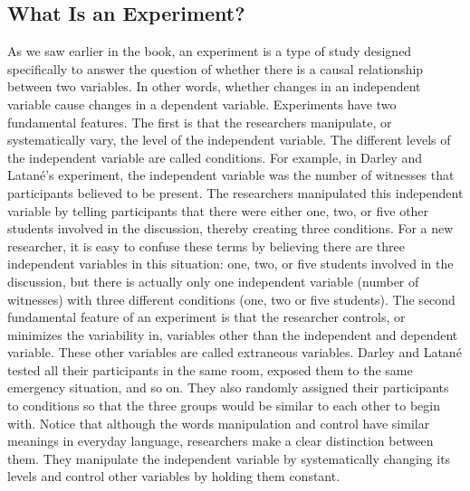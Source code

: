 
 \subsection{What Is an Experiment?}
 
 As we saw earlier in the book, an experiment is a type of study designed specifically to answer the question of whether there is a causal relationship between two variables. In other words, whether changes in an independent variable cause changes in a dependent variable. Experiments have two fundamental features. The first is that the researchers manipulate, or systematically vary, the level of the independent variable. The different levels of the independent variable are called conditions. For example, in Darley and Latané's experiment, the independent variable was the number of witnesses that participants believed to be present. The researchers manipulated this independent variable by telling participants that there were either one, two, or five other students involved in the discussion, thereby creating three conditions. For a new researcher, it is easy to confuse these terms by believing there are three independent variables in this situation: one, two, or five students involved in the discussion, but there is actually only one independent variable (number of witnesses) with three different conditions (one, two or five students). The second fundamental feature of an experiment is that the researcher controls, or minimizes the variability in, variables other than the independent and dependent variable. These other variables are called extraneous variables. Darley and Latané tested all their participants in the same room, exposed them to the same emergency situation, and so on. They also randomly assigned their participants to conditions so that the three groups would be similar to each other to begin with. Notice that although the words manipulation and control have similar meanings in everyday language, researchers make a clear distinction between them. They manipulate the independent variable by systematically changing its levels and control other variables by holding them constant.
 
